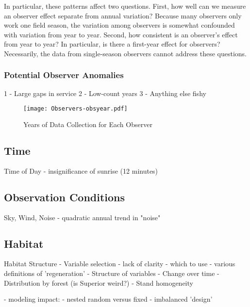 

In particular, these patterns affect two questions.  First, how well can we measure an observer effect separate from annual variation?  Because many observers only work one field season, the variation among observers is somewhat confounded with variation from year to year.  Second, how consistent is an observer's effect from year to year?  In particular, is there a first-year effect for observers?  Necessarily, the data from single-season observers cannot address these questions.

\subsubsection{Potential Observer Anomalies}

1 - Large gaps in service
2 - Low-count years
3 - Anything else fishy

\begin{figure}
\texttt{[image: Observers-obsyear.pdf]}
\caption{Years of Data Collection for Each Observer}
\label{fig:Observers-obsyear}
\end{figure}





\subsection{Time}

Time of Day
- insignificance of sunrise (12 minutes)





\subsection{Observation Conditions}

Sky, Wind, Noise
- quadratic annual trend in "noise"





\subsection{Habitat}

Habitat Structure
- Variable selection
  - lack of clarity
    - which to use
    - various definitions of 'regeneration'
- Structure of variables
- Change over time
- Distribution by forest (is Superior weird?)
- Stand homogeneity

- modeling impact:
  - nested random versus fixed
  - imbalanced 'design'